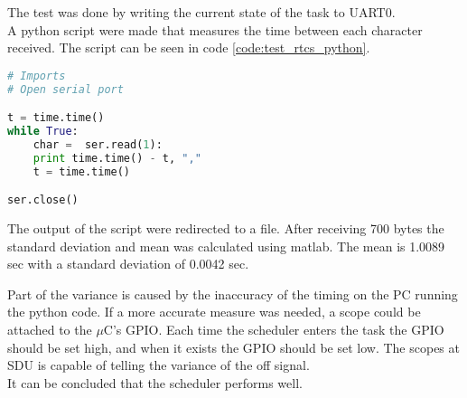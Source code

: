 The test was done by writing the current state of the task to UART0.\\ A python script were made that measures the time between each character received. The script can be seen in code \ref{code:test_rtcs_python}.
\begin{lstlisting}[language = python, caption = Python code used to measure time between received byte, label=code:test_rtcs_python]
# Imports
# Open serial port

t = time.time()
while True:
    char =  ser.read(1):
    print time.time() - t, ","
    t = time.time()

ser.close()
\end{lstlisting}
The output of the script were redirected to a file. After receiving 700 bytes the standard deviation and mean was calculated using matlab.
The mean is 1.0089 sec with a standard deviation of 0.0042 sec.

Part of the variance is caused by the inaccuracy of the timing on the PC running the python code. If a more accurate measure was needed, a scope could be attached to the $\mu$C's GPIO. Each time the scheduler enters the task the GPIO should be set high, and when it exists the GPIO should be set low. The scopes at SDU is capable of telling the variance of the off signal. \\
It can be concluded that the scheduler performs well.

